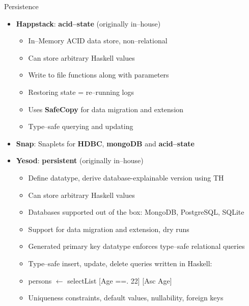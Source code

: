 \documentclass[10pt,usenames,dvipsnames]{beamer}
\begin{document}
	\begin{frame}{Persistence}
		
		\begin{itemize}
		\item \textbf{Happstack}: \textbf{acid--state} (originally in--house)
		\begin{itemize}
			\item In--Memory ACID data store, non--relational
			\item Can store arbitrary Haskell values
			\item Write to file functions along with parameters
			\item Restoring state = re--running logs
			\item Uses \textbf{SafeCopy} for data migration and extension
			\item Type--safe querying and updating
		\end{itemize}
		\item\textbf{Snap}: Snaplets for \textbf{HDBC}, \textbf{mongoDB} and \textbf{acid--state}
		\item \textbf{Yesod}: \textbf{persistent} (originally in--house)
		\begin{itemize}
			\item Define datatype, derive database-explainable version using TH
			\item Can store arbitrary Haskell values
			\item Databases supported out of the box: MongoDB, PostgreSQL, SQLite
			\item Support for data migration and extension, dry runs
			\item Generated primary key datatype enforces type--safe relational queries
			\item Type--safe insert, update, delete queries written in Haskell:
			\item persons $ \leftarrow $ selectList [Age ==. 22] [Asc Age]
			\item Uniqueness constraints, default values, nullability, foreign keys
		\end{itemize}
		\end{itemize}
		
	\end{frame}
\end{document}
